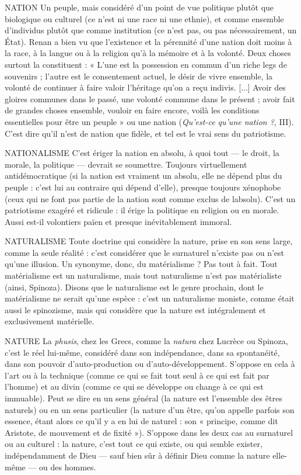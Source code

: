 NATION Un peuple, mais considéré d’un point de vue politique plutôt que
biologique ou culturel (ce n’est ni une race ni une ethnie), et
comme ensemble d'individus plutôt que comme institution (ce n’est pas, ou
pas nécessairement, un État). Renan a bien vu que l'existence et la pérennité
d’une nation doit moins à la race, à la langue ou à la religion qu’à la mémoire
et à la volonté. Deux choses surtout la constituent : « L’une est la possession en
commun d’un riche legs de souvenirs ; l’autre est le consentement actuel, le
désir de vivre ensemble, la volonté de continuer à faire valoir l’héritage qu’on a
reçu indivis. [...] Avoir des gloires communes dans le passé, une volonté commune
dans le présent ; avoir fait de grandes choses ensemble, vouloir en faire
encore, voilà les conditions essentielles pour être un peuple » ou une nation
({\it Qu'est-ce qu'une nation ?}, III). C’est dire qu’il n’est de nation que fidèle, et tel
est le vrai sens du patriotisme.

NATIONALISME C'est ériger la nation en absolu, à quoi tout — le droit, la
morale, la politique — devrait se soumettre. Toujours virtuellement
antidémocratique (si la nation est vraiment un absolu, elle ne
dépend plus du peuple : c’est lui au contraire qui dépend d’elle), presque toujours
xénophobe (ceux qui ne font pas partie de la nation sont comme exclus
de labsolu). C’est un patriotisme exagéré et ridicule : il érige la politique en
religion ou en morale. Aussi est-il volontiers païen et presque inévitablement
immoral.

NATURALISME Toute doctrine qui considère la nature, prise en son sens
large, comme la seule réalité : c’est considérer que le surnaturel
n’existe pas ou n’est qu’une illusion. Un synonyme, donc, du
matérialisme ? Pas tout à fait. Tout matérialisme est un naturalisme, mais tout
naturalisme n’est pas matérialiste (ainsi, Spinoza). Disons que le naturalisme
est le genre prochain, dont le matérialisme ne serait qu’une espèce : c'est un
naturalisme moniste, comme était aussi le spinozisme, mais qui considère que
la nature est intégralement et exclusivement matérielle.

NATURE La {\it phusis}, chez les Grecs, comme la {\it natura} chez Lucrèce ou Spinoza,
c’est le réel lui-même, considéré dans son indépendance,
dans sa spontanéité, dans son pouvoir d’auto-production ou d’auto-développement.
S’oppose en cela à l’art ou à la technique (comme ce qui se fait tout seul
à ce qui est fait par l’homme) et au divin (comme ce qui se développe ou
change à ce qui est immuable). Peut se dire en un sens général (la nature est
l’ensemble des êtres naturels) ou en un sens particulier (la nature d’un être,
qu’on appelle parfois son essence, étant alors ce qu’il y a en lui de naturel : son
« principe, comme dit Aristote, de mouvement et de fixité »). S’oppose dans les
deux cas au surnaturel ou au culturel : la nature, c’est tout ce qui existe, ou qui
semble exister, indépendamment de Dieu — sauf bien sûr à définir Dieu comme
la nature elle-même — ou des hommes.

